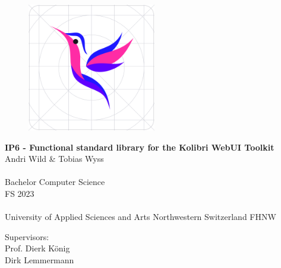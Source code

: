 






\begin{titlepage}
\begin{center}

    \begin{figure}[H]
        \centering
        \includegraphics[width=0.50\textwidth]{./frontmatter/pictures/kolibri-logo}
    \end{figure}

    \vspace*{1cm}
    {\huge \bfseries IP6 - Functional standard library for the Kolibri WebUI
    Toolkit  \\ }
    \vspace{2cm}
    {\large 
      Andri Wild \& Tobias Wyss\\

    	~\\
    	Bachelor Computer Science\\
    	\vspace{3.5cm}
    	FS 2023\\
    	~\\
    	University of Applied Sciences and Arts Northwestern Switzerland FHNW\\
    }




{\large
	Supervisors: \\[\baselineskip]
	Prof. Dierk König\\
	Dirk Lemmermann\\[1cm]
}
\end{center}

\vspace*{2cm} %

\end{titlepage}




\begin{titlepage}
\thispagestyle{empty}
\newpage
\mbox{}
\end{titlepage}

